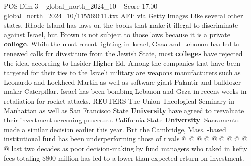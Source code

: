 \begin{textsample}{POS Dim 3 – global\_north\_2024\_10 – Score 17.00 – global\_north\_2024\_10/115569611.txt}
AFP via Getty Images Like several other states, Rhode Island has laws on the books that make it illegal to discriminate against Israel, but Brown is not subject to those laws because it is a private \textbf{college}.
While the most recent fighting in Israel, Gaza and Lebanon has led to renewed calls for divestiture from the Jewish State, most \textbf{colleges} have rejected the idea, according to Insider Higher Ed.
Among the companies that have been targeted for their ties to the Israeli military are weapons manufacturers such as Leonardo and Lockheed Martin as well as software giant Palantir and bulldozer maker Caterpillar.
Israel has been bombing Lebanon and Gaza in recent weeks in retaliation for rocket attacks.
REUTERS The Union Theological Seminary in Manhattan as well as San Francisco State \textbf{University} have agreed to reevaluate their investment screening processes.
California State \textbf{University}, Sacramento made a similar decision earlier this year.
But the Cambridge, Mass. -based institutional fund has been underperforming those of rivals @ @ @ @ @ @ @ @ @ @ last two decades as poor decision-making by fund managers who raked in hefty fees totaling \$800 million has led to a lower-than-expected return on investment.

\end{textsample}
